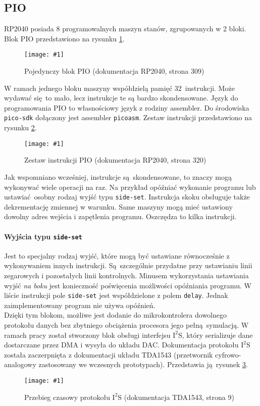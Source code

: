 \documentclass[polish]{aghengthesis}
\newcommand{\imgint}[4]{
	\begin{figure}[{#4}]
		\centering
		\texttt{[image: \#1]}
		\caption{#2}
		\label{#1}
	\end{figure}
}
\newcommand{\imgh}[3]{\imgint{#1}{#2}{#3}{H}}
\newcommand{\isqs}{$\text{I}^{2}\text{S}$}
\newcommand{\sset}{\lstinline|side-set|}
\begin{document}
		\subsection{PIO}
			RP2040 posiada 8 programowalnych maszyn stanów, zgrupowanych w 2 bloki.
			Blok PIO przedstawiono na rysunku \ref{3/pio_block}.
			\imgh{3/pio_block}{Pojedynczy blok PIO (dokumentacja RP2040\textsuperscript{\cite{pico_pdf}}, strona 309)}{0.7}
			
			W ramach jednego bloku maszyny współdzielą pamięć 32 instrukcji. Może wydawać się to mało, lecz instrukcje te są bardzo skondensowane. Język do programowania PIO to własnościowy język z rodziny assembler. Do środowiska \lstinline|pico-sdk| dołączony jest assembler \lstinline|picoasm|. Zestaw instrukcji przedstawiono na rysunku \ref{3/pio_instr}.
			\imgh{3/pio_instr}{Zestaw instrukcji PIO (dokumentacja RP2040, strona 320)}{0.7}
			
			Jak wspomniano wcześniej, instrukcje są skondensowane, to znaczy mogą wykonywać wiele operacji na raz. Na przykład opóźniać wykonanie programu lub ustawiać osobny rodzaj wyjść typu \sset{}.
			Instrukcja skoku obsługuje także dekrementację zmiennej w warunku. Same maszyny mogą mieć ustawiony dowolny adres wejścia i zapętlenia programu. Oszczędza to kilka instrukcji.
			
			\paragraph{Wyjścia typu \sset{}}
				Jest to specjalny rodzaj wyjść, które mogą być ustawiane równocześnie z wykonywaniem innych instrukcji. Są szczególnie przydatne przy ustawianiu linii zegarowych i pozostałych linii kontrolnych. Minusem wykorzystania ustawiania wyjść \textit{na boku} jest konieczność poświęcenia możliwości opóźniania programu. W liście instrukcji pole \sset{} jest współdzielone z polem \lstinline|delay|. Jednak zaimplementowany program nie używa opóźnień.
			$ $\\
			
			Dzięki tym blokom, możliwe jest dodanie do mikrokontrolera dowolnego protokołu danych bez zbytniego obciążenia procesora jego pełną symulacją. W ramach pracy został stworzony blok obsługi interfejsu \isqs{}, który serializuje dane dostarczane przez DMA i wysyła do układu DAC.
			Dokumentacja protokołu \isqs{} została zaczerpnięta z dokumentacji układu TDA1543 (przetwornik cyfrowo-analogowy zastosowany we wczesnych prototypach). Przedstawia ją rysunek \ref{3/pio_i2s_docs}.
			\imgh{3/pio_i2s_docs}{Przebieg czasowy protokołu \isqs{} (dokumentacja TDA1543\textsuperscript{\cite{tda_pdf}}, strona 9)}{0.9}
			
\end{document}
